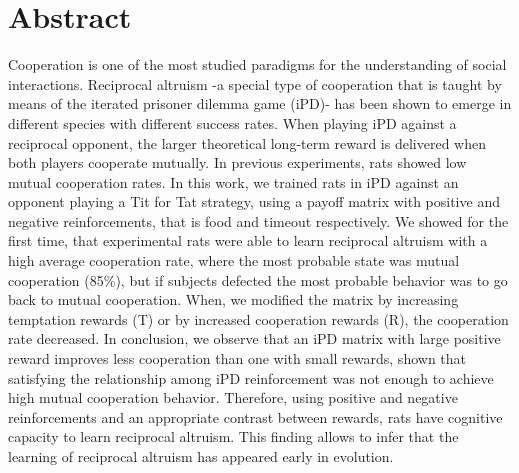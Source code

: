 \documentclass[10pt,letterpaper]{article}
\begin{document}
\section*{Abstract}
Cooperation is one of the most studied paradigms for the understanding of social interactions. Reciprocal altruism -a special type of cooperation that is taught by means of the iterated prisoner dilemma game (iPD)- has been shown to emerge in different species with different success rates. When playing iPD against a reciprocal opponent, the larger theoretical long-term reward is delivered when both players cooperate mutually. In previous experiments, rats showed low mutual cooperation rates. In this work, we trained rats in iPD against an opponent playing a Tit for Tat strategy, using a payoff matrix with positive and negative reinforcements, that is food and timeout respectively. We showed for the first time, that experimental rats were able to learn reciprocal altruism with a high average cooperation rate, where the most probable state was mutual cooperation (85\%), but if subjects defected the most probable behavior was to go back to mutual cooperation. When, we modified the matrix by increasing temptation rewards (T) or by increased cooperation rewards (R), the cooperation rate decreased. In conclusion, we observe that an iPD matrix with large positive reward improves less cooperation than one with small rewards, shown that satisfying the relationship among iPD reinforcement was not enough to achieve high mutual cooperation behavior. Therefore, using positive and negative reinforcements and an appropriate contrast between rewards, rats have cognitive capacity to learn reciprocal altruism. This finding allows to infer that the learning of reciprocal altruism has appeared early in evolution.


\end{document}
